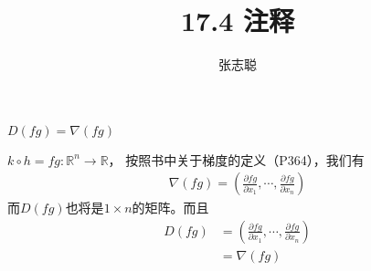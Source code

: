 \documentclass{article}
\begin{document}
\title{17.4 注释}
\author{张志聪}
\maketitle

\begin{zremark}
  $D(fg) = \nabla (fg)$
\end{zremark}

$k \circ h = fg: \mathbb{R}^n \to \mathbb{R}$，
按照书中关于梯度的定义（P364），我们有
\begin{align*}
  \nabla (fg) = \left(\frac{\partial fg}{\partial x_1}, \cdots, \frac{\partial fg}{\partial x_n}\right)
\end{align*}
而$D(fg)$也将是$1 \times n$的矩阵。而且
\begin{align*}
  D(fg) & = \left(\frac{\partial fg}{\partial x_1}, \cdots, \frac{\partial fg}{\partial x_n}\right) \\
        & = \nabla (fg)
\end{align*}
\end{document}
